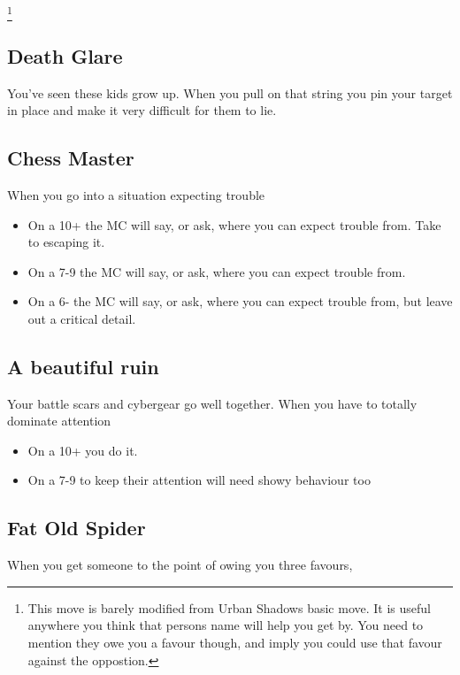 \documentclass{tufte-book}
\begin{document}
\footnote{This move is barely modified from Urban Shadows basic move. It is useful anywhere you think that persons name will help you get by. You need to mention they owe you a favour though, and imply you could use that favour against the oppostion.}

\subsection{Death Glare}
You've seen these kids grow up. When you pull on that string you pin your target in place and make it very difficult for them to lie.

\subsection{Chess Master}
When you go into a situation expecting trouble 
\begin{itemize}
	\item On a 10+ the MC will say, or ask, where you can expect trouble from. Take  to escaping it.
	\item On a 7-9 the MC will say, or ask, where you can expect trouble from.
	\item On a 6- the MC will say, or ask, where you can expect trouble from, but leave out a critical detail.
\end{itemize}

\subsection{A beautiful ruin}
Your battle scars and cybergear go well together. When you have to totally dominate attention 
\begin{itemize} 
	\item On a 10+ you do it.
	\item On a 7-9 to keep their attention will need showy behaviour too
\end{itemize}

\subsection{Fat Old Spider}
When you get someone to the point of owing you three favours, 
\end{document}
